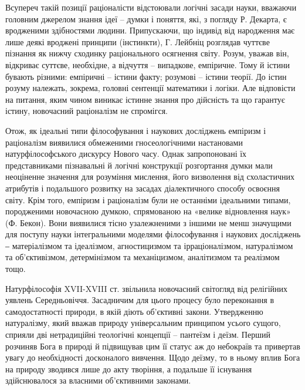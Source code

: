 Всупереч такій позиції раціоналісти відстоювали логічні засади науки,
вважаючи головним джерелом знання ідеї – думки і поняття, які, з погляду Р.
Декарта, є вродженими здібностями людини. Припускаючи, що індивід від
народження має лише деякі вроджені принципи (інстинкти), Г. Лейбніц
розглядав чуттєве пізнання як нижчу сходинку раціонального осягнення світу.
Розум, уважав він, відкриває суттєве, необхідне, а відчуття – випадкове,
емпіричне. Тому й істини бувають різними: емпіричні – істини факту; розумові
– істини теорії. До істин розуму належать, зокрема, головні сентенції
математики і логіки. Але відповісти на питання, яким чином виникає істинне
знання про дійсність та що гарантує істину, новочасний раціоналізм не
спромігся.

Отож, як ідеальні типи філософування і наукових досліджень емпіризм і
раціоналізм виявилися обмеженими гносеологічними настановами
натурфілософського дискурсу Нового часу. Однак запропоновані їх
представниками пізнавальні й логічні конструкції розгортання думки мали
неоціненне значення для розуміння мислення, його визволення від
схоластичних атрибутів і подальшого розвитку на засадах діалектичного
способу освоєння світу. Крім того, емпіризм і раціоналізм були не останніми
ідеальними типами, породженими новочасною думкою, спрямованою на
«велике відновлення наук» (Ф. Бекон). Вони виявилися тісно узалежненими з
іншими не менш значущими для поступу науки інтегральними моделями
філософування і наукових досліджень ‒ матеріалізмом та ідеалізмом,
агностицизмом та ірраціоналізмом, натуралізмом та об’єктивізмом,
детермінізмом та механіцизмом, аналітизмом та реалізмом тощо.

Натурфілософія XVII-XVIII ст. звільнила новочасний світогляд від
релігійних уявлень Середньовіччя. Засадничим для цього процесу було
переконання в самодостатності природи, в якій діють об’єктивні закони.
Утвердженню натуралізму, який вважав природу універсальним принципом
усього сущого, сприяли дві нетрадиційні теологічні концепції – пантеїзм і
деїзм. Перший розчиняв Бога в природі й підвищував цим її статус аж до
небокраїв та привертав увагу до необхідності досконалого вивчення. Щодо
деїзму, то в ньому вплив Бога на природу зводився лише до акту творіння, а
подальше її існування здійснювалося за власними об’єктивними законами.

